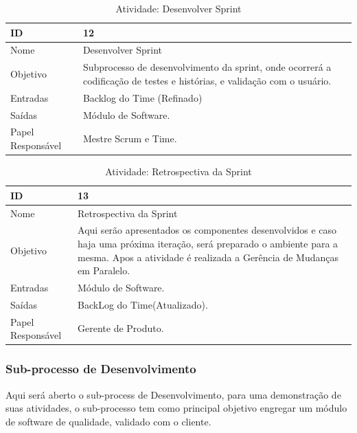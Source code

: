   \begin{table}[H]
    \centering
      \begin{tabular}{| m{5em} | m{10cm} |}
        \hline
        ID       & 12   \\ \hline
        Nome     & Desenvolver  Sprint  \\ \hline
        Objetivo & Subprocesso de desenvolvimento da sprint, onde ocorrerá a codificação de testes e histórias, e validação com o usuário.  \\ \hline
        Entradas & Backlog do Time (Refinado)\\ \hline
        Saídas   & Módulo de Software. \\ \hline
        Papel Responsável   & Mestre Scrum e Time. \\ \hline
      \end{tabular}
      \caption{Atividade: Desenvolver  Sprint}
      \label{tabela:atividade12}
  \end{table}

  \begin{table}[H]
    \centering
      \begin{tabular}{| m{5em} | m{10cm} |}
        \hline
        ID       & 13   \\ \hline
        Nome     & Retrospectiva da Sprint  \\ \hline
        Objetivo & Aqui serão apresentados os componentes desenvolvidos e caso haja uma próxima iteração, será preparado o ambiente para a mesma. Apos a atividade é realizada a Gerência de Mudanças em Paralelo.  \\ \hline
        Entradas & Módulo de Software. \\ \hline
        Saídas   & BackLog do Time(Atualizado). \\ \hline
        Papel Responsável   & Gerente de Produto. \\ \hline
      \end{tabular}
      \caption{Atividade: Retrospectiva da Sprint}
      \label{tabela:atividade13}
  \end{table}

  \subsubsection{Sub-processo de Desenvolvimento}

  Aqui será aberto o sub-process de Desenvolvimento, para uma demonstração de suas atividades, o sub-processo tem como principal objetivo
  engregar um módulo de software de qualidade, validado com o cliente.

